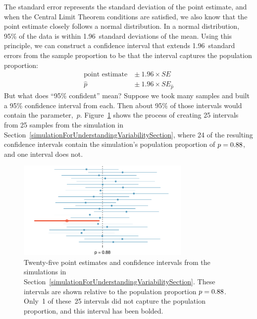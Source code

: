 The standard error represents the standard deviation
of the point estimate, and when the Central
Limit Theorem conditions are satisfied, we also know
that the point estimate closely follows a normal
distribution. In a normal distribution, 95\% of
the data is within 1.96~standard deviations of the mean.
Using this principle, we can construct a confidence
interval that extends 1.96~standard errors from the sample
proportion to be 
that the interval captures the population proportion:
\begin{align*}
\text{point estimate}\ &\pm\ 1.96 \times SE \\
\hat{p}\ &\pm\ 1.96 \times SE_{\hat{p}}
\end{align*}
But what does ``95\% confident'' mean? Suppose we took
many samples and built a 95\% confidence interval from
each. Then about 95\% of those intervals would
contain the parameter,~$p$.
Figure~\ref{95PercentConfidenceInterval} shows the
process of creating 25 intervals from 25 samples
from the simulation in
Section~\ref{simulationForUnderstandingVariabilitySection},
where 24 of the resulting confidence intervals contain
the simulation's population proportion of
$p = 0.88{}$, and one interval does not.

\begin{figure}
   \centering
   \includegraphics[width=0.75\textwidth]{ch_foundations_for_inf/figures/95PercentConfidenceInterval/95PercentConfidenceInterval}
   \caption{Twenty-five point estimates and confidence
       intervals from the simulations in
       Section~\ref{simulationForUnderstandingVariabilitySection}.
       These intervals are shown relative to the population
       proportion $p = 0.88{}$.
       Only~1 of these~25
       intervals did not capture the population
       proportion, and this interval has been bolded.}
   \label{95PercentConfidenceInterval}
\end{figure}

